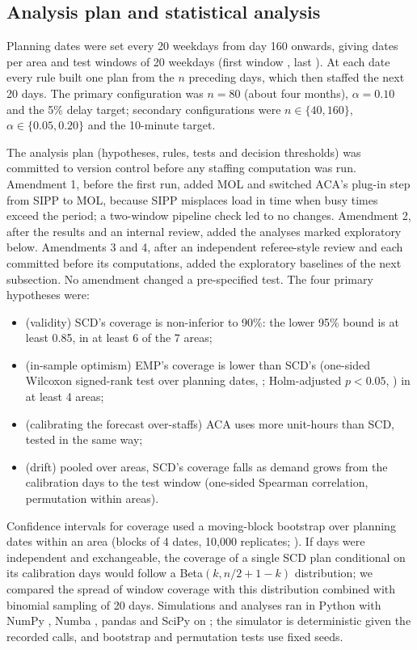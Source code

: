 \documentclass[12pt]{article}
\begin{document}
\subsection{Analysis plan and statistical analysis}

Planning dates were set every 20 weekdays from day 160 onwards, giving  dates per area and  test windows of 20 weekdays (first window , last ). At each date every rule built one plan from the $n$ preceding days, which then staffed the next 20 days. The primary configuration was $n=80$ (about four months), $\alpha=0.10$ and the 5\% delay target; secondary configurations were $n\in\{40,160\}$, $\alpha\in\{0.05,0.20\}$ and the 10-minute target.

The analysis plan (hypotheses, rules, tests and decision thresholds) was committed to version control before any staffing computation was run. Amendment 1, before the first run, added MOL and switched ACA's plug-in step from SIPP to MOL, because SIPP misplaces load in time when busy times exceed the period; a two-window pipeline check led to no changes. Amendment 2, after the results and an internal review, added the analyses marked exploratory below. Amendments 3 and 4, after an independent referee-style review and each committed before its computations, added the exploratory baselines of the next subsection. No amendment changed a pre-specified test. The four primary hypotheses were:
\begin{itemize}
\item[H1] (validity) SCD's coverage is non-inferior to 90\%: the lower 95\% bound is at least 0.85, in at least 6 of the 7 areas;
\item[H2] (in-sample optimism) EMP's coverage is lower than SCD's (one-sided Wilcoxon signed-rank test over planning dates, \citealp{wilcoxon1945individual}; Holm-adjusted $p<0.05$, \citealp{holm1979simple}) in at least 4 areas;
\item[H3] (calibrating the forecast over-staffs) ACA uses more unit-hours than SCD, tested in the same way;
\item[H4] (drift) pooled over areas, SCD's coverage falls as demand grows from the calibration days to the test window (one-sided Spearman correlation, permutation within areas).
\end{itemize}
Confidence intervals for coverage used a moving-block bootstrap over planning dates within an area (blocks of 4 dates, 10{,}000 replicates; \citealp{kunsch1989jackknife}). If days were independent and exchangeable, the coverage of a single SCD plan conditional on its calibration days would follow a Beta$(k, n/2+1-k)$ distribution; we compared the spread of window coverage with this distribution combined with binomial sampling of 20 days. Simulations and analyses ran in Python  with NumPy , Numba , pandas  and SciPy  on ; the simulator is deterministic given the recorded calls, and bootstrap and permutation tests use fixed seeds.
\end{document}
